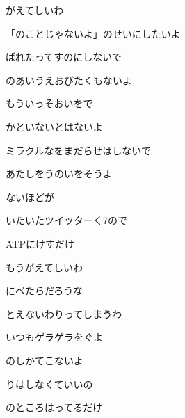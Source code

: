 \documentclass[a4paper,tate,twocolumn,12pt]{ltjtarticle}
\begin{document}
\thispagestyle{empty}

\begin{center}
{\LARGE {}がえてしいわ}
\end{center}

\vspace{1em}

\begin{flushleft}

\noindent\begin{minipage}{\linewidth}
「のことじゃないよ」のせいにしたいよ

ばれたってすのにしないで

のあいうえおびたくもないよ

もういっそおいをで

かといないとはないよ

ミラクルなをまだらせはしないで

あたしをうのいをそうよ

ないほどが

いたいたツイッターく7ので

ATPにけすだけ
\end{minipage}

\vspace{2em}

\noindent\begin{minipage}{\linewidth}
もうがえてしいわ

にべたらだろうな

とえないわりってしまうわ

いつもゲラゲラをぐよ

のしかてこないよ

りはしなくていいの

のところはってるだけ
\end{minipage}


\end{flushleft}
\end{document}
